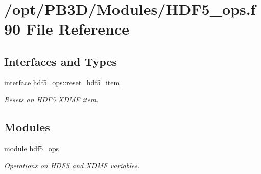 \hypertarget{HDF5__ops_8f90}{}\section{/opt/\+P\+B3\+D/\+Modules/\+H\+D\+F5\+\_\+ops.f90 File Reference}
\label{HDF5__ops_8f90}
\subsection*{Interfaces and Types}
\begin{DoxyCompactItemize}
\item 
interface \hyperlink{interfacehdf5__ops_1_1reset__hdf5__item}{hdf5\+\_\+ops\+::reset\+\_\+hdf5\+\_\+item}
\begin{DoxyCompactList}\small\item\em Resets an H\+D\+F5 X\+D\+MF item. \end{DoxyCompactList}\end{DoxyCompactItemize}
\subsection*{Modules}
\begin{DoxyCompactItemize}
\item 
module \hyperlink{namespacehdf5__ops}{hdf5\+\_\+ops}
\begin{DoxyCompactList}\small\item\em Operations on H\+D\+F5 and X\+D\+MF variables. \end{DoxyCompactList}\end{DoxyCompactItemize}
